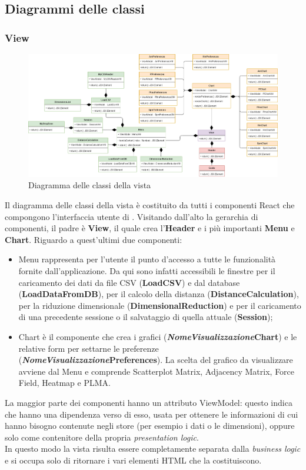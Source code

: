 \subsection{Diagrammi delle classi}
\subsubsection{View}
\begin{figure}[hb]
\includegraphics[width=\linewidth]{Images/Allegato Tecnico-Class View}
\centering
\caption{Diagramma delle classi della vista}
\end{figure}
Il diagramma delle classi della vista è costituito da tutti i componenti React che compongono l'interfaccia utente di \NomeProgetto{}.
Visitando dall'alto la gerarchia di componenti, il padre è \textbf{View}, il quale crea l'\textbf{Header} e i più importanti \textbf{Menu} e \textbf{Chart}. Riguardo a quest'ultimi due componenti:
\begin{itemize}
	\item Menu rappresenta per l'utente il punto d'accesso a tutte le funzionalità fornite dall'applicazione. Da qui sono infatti accessibili le finestre per il caricamento dei dati da file CSV (\textbf{LoadCSV}) e dal database (\textbf{LoadDataFromDB}), per il calcolo della distanza (\textbf{DistanceCalculation}), per la riduzione dimensionale (\textbf{DimensionalReduction}) e per il caricamento di una precedente sessione o il salvataggio di quella attuale (\textbf{Session});
	\item Chart è il componente che crea i grafici (\textbf{\textit{NomeVisualizzazione}Chart}) e le relative form per settarne le preferenze (\textbf{\textit{NomeVisualizzazione}Preferences}). La scelta del grafico da visualizzare avviene dal Menu e comprende Scatterplot Matrix, Adjacency Matrix, Force Field, Heatmap e PLMA.  
\end{itemize}
La maggior parte dei componenti hanno un attributo ViewModel: questo indica che hanno una dipendenza verso di esso, usata per ottenere le informazioni di cui hanno bisogno contenute negli store (per esempio i dati o le dimensioni), oppure solo come contenitore della propria \textit{presentation logic}. \\
In questo modo la vista risulta essere completamente separata dalla \textit{business logic} e si occupa solo di ritornare i vari elementi HTML che la costituiscono. 


